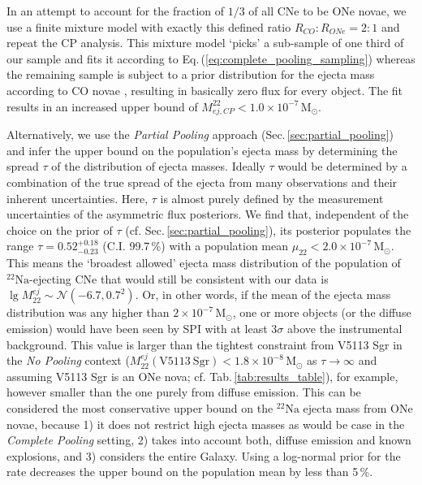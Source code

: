 \documentclass{aa}
\newcommand{\mrm}[1]{\mathrm{#1}}
\newcommand{\nuc}[2]{$\mrm{^{#2}#1}$}
\begin{document}
In an attempt to account for the fraction of $1/3$ of all CNe to be ONe novae, we use a finite mixture model with exactly this defined ratio $R_{CO} : R_{ONe} = 2 : 1$ and repeat the CP analysis.
%
This mixture model `picks' a sub-sample of one third of our sample and fits it according to Eq.\,(\ref{eq:complete_pooling_sampling}) whereas the remaining sample is subject to a prior distribution for the ejecta mass according to CO novae \citep[$\lg M_{22}^{ej,CO} \sim \mathscr{N}(-12,1^2)$,][]{Starrfield2020_COnovae}, resulting in basically zero flux for every object.
%
The fit results in an increased upper bound of $M_{ej,CP}^{22} < 1.0 \times 10^{-7}\,\mrm{M_{\odot}}$.

Alternatively, we use the \textit{Partial Pooling} approach (Sec.\,\ref{sec:partial_pooling}) and infer the upper bound on the population's ejecta mass by determining the spread $\tau$ of the distribution of ejecta masses.
%
Ideally $\tau$ would be determined by a combination of the true spread of the ejecta from many observations and their inherent uncertainties.
%
Here, $\tau$ is almost purely defined by the measurement uncertainties of the asymmetric flux posteriors.
%
We find that, independent of the choice on the prior of $\tau$ (cf. Sec.\,\ref{sec:partial_pooling}), its posterior populates the range $\tau = 0.52_{-0.23}^{+0.18}$ (C.I. 99.7\,\%) with a population mean $\mu_{22} < 2.0 \times 10^{-7}\,\mrm{M_{\odot}}$.
%
This means the `broadest allowed' ejecta mass distribution of the population of \nuc{Na}{22}-ejecting CNe that would still be consistent with our data is $\lg M_{22}^{ej} \sim \mathscr{N}(-6.7,0.7^2)$.
%
Or, in other words, if the mean of the ejecta mass distribution was any higher than $2 \times 10^{-7}\,\mrm{M_{\odot}}$, one or more objects (or the diffuse emission) would have been seen by SPI with at least $3\sigma$ above the instrumental background.
%
This value is larger than the tightest constraint from V5113 Sgr in the \textit{No Pooling} context ($M_{22}^{ej}(\mrm{V5113~Sgr}) < 1.8 \times 10^{-8}\,\mrm{M_{\odot}}$ as $\tau \rightarrow \infty$ and assuming V5113 Sgr is an ONe nova; cf. Tab.\,\ref{tab:results_table}), for example, however smaller than the one purely from diffuse emission.
%
This can be considered the most conservative upper bound on the \nuc{Na}{22} ejecta mass from ONe novae, because 1) it does not restrict high ejecta masses as would be case in the \textit{Complete Pooling} setting, 2) takes into account both, diffuse emission and known explosions, and 3) considers the entire Galaxy.
%
Using a log-normal prior for the rate decreases the upper bound on the population mean by less than 5\,\%.
\end{document}
